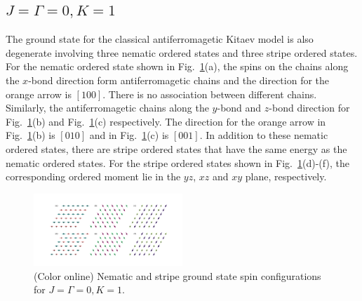\documentclass[aps,prb,reprint,amsfonts,amsmath,amssymb,showpacs,groupedaddress,superscriptaddress]{revtex4-1}
\begin{document}
\subsection{$J=\Gamma=0, K=1$}
The ground state for the classical antiferromagetic Kitaev model is also degenerate involving three nematic ordered states and three stripe ordered states. For the nematic ordered state shown in Fig.~\ref{fig:GSForPositiveK}(a), the spins on the chains along the $x$-bond direction form antiferromagetic chains and the direction for the orange arrow is $[100]$. There is no association between different chains. Similarly, the antiferromagetic chains along the $y$-bond and $z$-bond direction for Fig.~\ref{fig:GSForPositiveK}(b) and Fig.~\ref{fig:GSForPositiveK}(c) respectively. The direction for the orange arrow in Fig.~\ref{fig:GSForPositiveK}(b) is $[010]$ and in Fig.~\ref{fig:GSForPositiveK}(c) is $[001]$. In addition to these nematic ordered states, there are stripe ordered states that have the same energy as the nematic ordered states. For the stripe ordered states shown in Fig.~\ref{fig:GSForPositiveK}(d)-(f), the corresponding ordered moment lie in the $yz$, $xz$ and $xy$ plane, respectively.
\begin{figure}
    \includegraphics[width=0.5\textwidth]{FigA3.pdf}
    \caption{\label{fig:GSForPositiveK}(Color online) Nematic and stripe ground state spin configurations for $J=\Gamma=0, K=1$.}
\end{figure}
\end{document}
